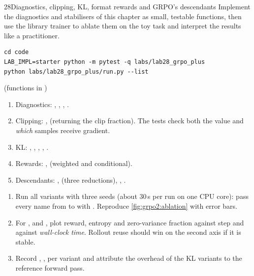 \begin{labbox}{28}{Diagnostics, clipping, KL, format rewards and GRPO's descendants}
Implement the diagnostics and stabilisers of this chapter as small, testable functions, then
use the library trainer to ablate them on the toy task and interpret the results like a
practitioner.

\begin{lstlisting}[style=shell]
cd code
LAB_IMPL=starter python -m pytest -q labs/lab28_grpo_plus
python labs/lab28_grpo_plus/run.py --list
\end{lstlisting}

 (functions in )
\begin{enumerate}
\item Diagnostics: , ,
, .
\item Clipping: ,  (returning the clip
fraction). The tests check both the value and \emph{which} samples receive gradient.
\item KL: , , , ,
.
\item Rewards: ,  (weighted and conditional).
\item Descendants: ,  (three
reductions), , .
\end{enumerate}

\begin{enumerate}
\item Run all variants with three seeds (about 30\,s per run on one CPU core):
pass every name from  to  with . Reproduce \cref{fig:grpo2:ablation} with
error bars.
\item For ,  and , plot reward, entropy
and zero-variance fraction against step and against \emph{wall-clock time}. Rollout reuse
should win on the second axis if it is stable.
\item Record , ,  per variant and attribute
the overhead of the KL variants to the reference forward pass.
\end{enumerate}


\end{labbox}
